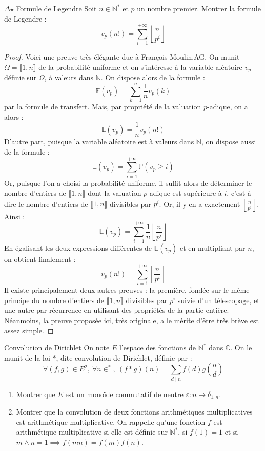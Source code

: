 \documentclass[french,a4paper]{article}
\renewcommand{\P}{\mathbb{P}}
\newcommand{\N}{\mathbb{N}}
\newcommand{\C}{\mathbb{C}}
\newcommand{\st}{^*}
\newcommand{\E}{\mathbb{E}}
\theoremstyle{plain}
\theoremstyle{definition}
\theoremstyle{remark}
\begin{document}
\begin{ex}[Révisions]{$\Delta$$\star$ Formule de Legendre}
	Soit $n\in\N\st$ et $p$ un nombre premier. Montrer la formule de Legendre : $$v_p(n!)=\sum_{i=1}^{+\infty}\left\lfloor\frac{n}{p^i}\right\rfloor$$
\end{ex}
\begin{proof}
	Voici une preuve très élégante due à François Moulin.AG. On munit $\Omega=\llbracket1,n\rrbracket$ de la probabilité uniforme et on s'intéresse à la variable aléatoire $v_p$ définie sur $\Omega$, à valeurs dans $\N$. On dispose alors de la formule : $$\E(v_p)=\sum_{k=1}^{n}\frac{1}{n}v_p(k)$$ par la formule de transfert. Mais, par propriété de la valuation $p$-adique, on a alors : $$\E(v_p)=\frac{1}{n}v_p(n!)$$ D'autre part, puisque la variable aléatoire est à valeurs dans $\N$, on dispose aussi de la formule : $$\E(v_p)=\sum_{i=1}^{+\infty}\P(v_p\geqslant i)$$ Or, puisque l'on a choisi la probabilité uniforme, il suffit alors de déterminer le nombre d'entiers de $\llbracket1,n\rrbracket$ dont la valuation $p$-adique est supérieure à $i$, c'est-à-dire le nombre d'entiers de $\llbracket1,n\rrbracket$ divisibles par $p^i$. Or, il y en a exactement $\displaystyle\left\lfloor\frac{n}{p^i}\right\rfloor$. Ainsi : $$\E(v_p)=\sum_{i=1}^{+\infty}\frac{1}{n}\left\lfloor\frac{n}{p^i}\right\rfloor$$ En égalisant les deux expressions différentes de $\E(v_p)$ et en multipliant par $n$, on obtient finalement : $$v_p(n!)=\sum_{i=1}^{+\infty}\left\lfloor\frac{n}{p^i}\right\rfloor$$
	Il existe principalement deux autres preuves : la première, fondée sur le même principe du nombre d'entiers de $\llbracket1,n\rrbracket$ divisibles par $p^i$ suivie d'un télescopage, et une autre par récurrence en utilisant des propriétés de la partie entière. Néanmoins, la preuve proposée ici, très originale, a le mérite d'être très brève est assez simple.
\end{proof}

\begin{ex}{Convolution de Dirichlet}
	On note $E$ l'espace des fonctions de $\N\st$ dans $\C$. On le munit de la loi $*$, dite convolution de Dirichlet, définie par : $$\forall (f,g)\in E^2,\ \forall n\in\st,\ (f*g)(n)=\sum_{d\mid n}f(d)g\left(\frac{n}{d}\right)$$
	\begin{enumerate}
		\item Montrer que $E$ est un monoïde commutatif de neutre $\varepsilon:n\mapsto\delta_{1,n}$.
		\item Montrer que la convolution de deux fonctions arithmétiques multiplicatives est arithmétique multiplicative. On rappelle qu'une fonction $f$ est arithmétique multiplicative si elle est définie sur $\N\st$, si $f(1)=1$ et si $m\wedge n=1\implies f(mn)=f(m)f(n)$.
	\end{enumerate}
\end{ex}
\end{document}
